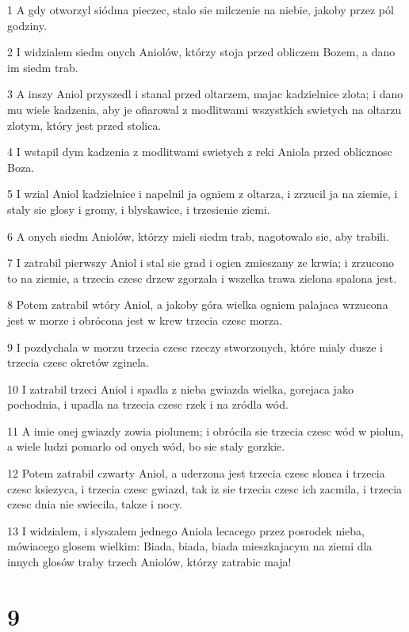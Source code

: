 \par 1 A gdy otworzyl siódma pieczec, stalo sie milczenie na niebie, jakoby przez pól godziny.
\par 2 I widzialem siedm onych Aniolów, którzy stoja przed obliczem Bozem, a dano im siedm trab.
\par 3 A inszy Aniol przyszedl i stanal przed oltarzem, majac kadzielnice zlota; i dano mu wiele kadzenia, aby je ofiarowal z modlitwami wszystkich swietych na oltarzu zlotym, który jest przed stolica.
\par 4 I wstapil dym kadzenia z modlitwami swietych z reki Aniola przed oblicznosc Boza.
\par 5 I wzial Aniol kadzielnice i napelnil ja ogniem z oltarza, i zrzucil ja na ziemie, i staly sie glosy i gromy, i blyskawice, i trzesienie ziemi.
\par 6 A onych siedm Aniolów, którzy mieli siedm trab, nagotowalo sie, aby trabili.
\par 7 I zatrabil pierwszy Aniol i stal sie grad i ogien zmieszany ze krwia; i zrzucono to na ziemie, a trzecia czesc drzew zgorzala i wszelka trawa zielona spalona jest.
\par 8 Potem zatrabil wtóry Aniol, a jakoby góra wielka ogniem palajaca wrzucona jest w morze i obrócona jest w krew trzecia czesc morza.
\par 9 I pozdychala w morzu trzecia czesc rzeczy stworzonych, które mialy dusze i trzecia czesc okretów zginela.
\par 10 I zatrabil trzeci Aniol i spadla z nieba gwiazda wielka, gorejaca jako pochodnia, i upadla na trzecia czesc rzek i na zródla wód.
\par 11 A imie onej gwiazdy zowia piolunem; i obrócila sie trzecia czesc wód w piolun, a wiele ludzi pomarlo od onych wód, bo sie staly gorzkie.
\par 12 Potem zatrabil czwarty Aniol, a uderzona jest trzecia czesc slonca i trzecia czesc ksiezyca, i trzecia czesc gwiazd, tak iz sie trzecia czesc ich zacmila, i trzecia czesc dnia nie swiecila, takze i nocy.
\par 13 I widzialem, i slyszalem jednego Aniola lecacego przez posrodek nieba, mówiacego glosem wielkim: Biada, biada, biada mieszkajacym na ziemi dla innych glosów traby trzech Aniolów, którzy zatrabic maja!

\chapter{9}

